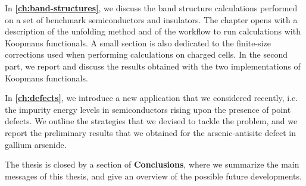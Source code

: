 In \textbf{\cref{ch:band-structures}}, we discuss the band structure calculations performed on a set of benchmark semiconductors and insulators. The chapter opens with a description of the unfolding method and of the workflow to run calculations with Koopmans functionals. A small section is also dedicated to the finite-size corrections used when performing calculations on charged cells. In the second part, we report and discuss the results obtained with the two implementations of Koopmans functionals.

In \textbf{\cref{ch:defects}}, we introduce a new application that we considered recently, i.e. the impurity energy levels in semiconductors rising upon the presence of point defects. We outline the strategies that we devised to tackle the problem, and we report the preliminary results that we obtained for the arsenic-antisite defect in gallium arsenide.

The thesis is closed by a section of \textbf{Conclusions}, where we summarize the main messages of this thesis, and give an overview of the possible future developments.
